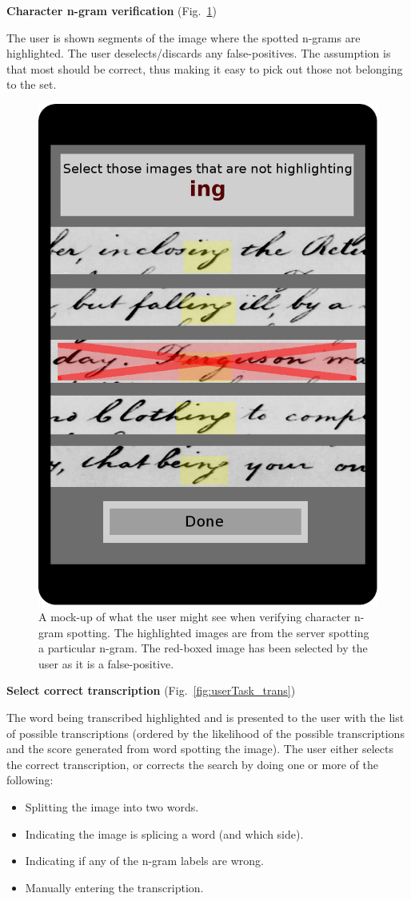 \documentclass[ms]{byuprop}
\begin{document}
{\setlength{\parindent}{0cm}
\textbf{Character n-gram verification} (Fig.~\ref{fig:userTask_spot})

\begin{addmargin}[3em]{3em}
The user is shown segments of the image where the spotted n-grams are highlighted. The user deselects/discards any false-positives. The assumption is that most should be correct, thus making it easy to pick out those not belonging to the set.
\\[.5cm]
\end{addmargin}

\begin{figure}
    \centering
    \includegraphics[width=.4\textwidth]{userTask_spot}
    \caption{A mock-up of what the user might see when verifying character n-gram spotting. The highlighted images are from the server spotting a particular n-gram. The red-boxed image has been selected by the user as it is a false-positive.}
    \label{fig:userTask_spot}
\end{figure}

\textbf{Select correct transcription} (Fig.~\ref{fig:userTask_trans})

\begin{addmargin}[3em]{3em}
The word being transcribed highlighted and is presented to the user with the list of possible transcriptions (ordered by the likelihood of the possible transcriptions and the score generated from word spotting the image). The user either selects the correct transcription, or corrects the search by doing one or more of the following:
\begin{itemize}
    \item Splitting the image into two words.
    \item Indicating the image is splicing a word (and which side).
    \item Indicating if any of the n-gram labels are wrong.
    \item Manually entering the transcription.
\end{itemize}

\end{addmargin}
}
\end{document}
